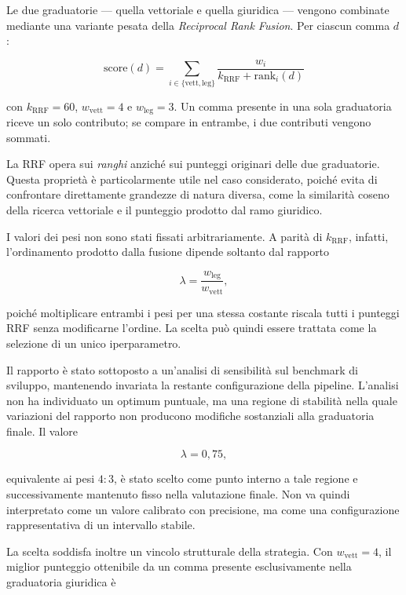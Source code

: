 Le due graduatorie --- quella vettoriale e quella giuridica --- vengono combinate mediante una variante pesata della \textit{Reciprocal Rank Fusion}. Per ciascun comma \(d\):

\begin{equation}
\mathrm{score}(d)
=
\sum_{i \in \{\text{vett},\text{leg}\}}
\frac{w_i}{k_{\mathrm{RRF}}+\mathrm{rank}_i(d)}
\label{eq:rrf}
\end{equation}

con \(k_{\mathrm{RRF}}=60\), \(w_{\mathrm{vett}}=4\) e \(w_{\mathrm{leg}}=3\). Un comma presente in una sola graduatoria riceve un solo contributo; se compare in entrambe, i due contributi vengono sommati.

La RRF opera sui \textit{ranghi} anziché sui punteggi originari delle due graduatorie. Questa proprietà è particolarmente utile nel caso considerato, poiché evita di confrontare direttamente grandezze di natura diversa, come la similarità coseno della ricerca vettoriale e il punteggio prodotto dal ramo giuridico.

I valori dei pesi non sono stati fissati arbitrariamente. A parità di \(k_{\mathrm{RRF}}\), infatti, l'ordinamento prodotto dalla fusione dipende soltanto dal rapporto

$$
\lambda =
\frac{w_{\mathrm{leg}}}{w_{\mathrm{vett}}},
$$

poiché moltiplicare entrambi i pesi per una stessa costante riscala tutti i punteggi RRF senza modificarne l'ordine. La scelta può quindi essere trattata come la selezione di un unico iperparametro.

Il rapporto è stato sottoposto a un'analisi di sensibilità sul benchmark di sviluppo, mantenendo invariata la restante configurazione della pipeline. L'analisi non ha individuato un optimum puntuale, ma una regione di stabilità nella quale variazioni del rapporto non producono modifiche sostanziali alla graduatoria finale. Il valore

$$
\lambda = 0{,}75,
$$

equivalente ai pesi \(4:3\), è stato scelto come punto interno a tale regione e successivamente mantenuto fisso nella valutazione finale. Non va quindi interpretato come un valore calibrato con precisione, ma come una configurazione rappresentativa di un intervallo stabile.

La scelta soddisfa inoltre un vincolo strutturale della strategia. Con \(w_{\mathrm{vett}}=4\), il miglior punteggio ottenibile da un comma presente esclusivamente nella graduatoria giuridica è


